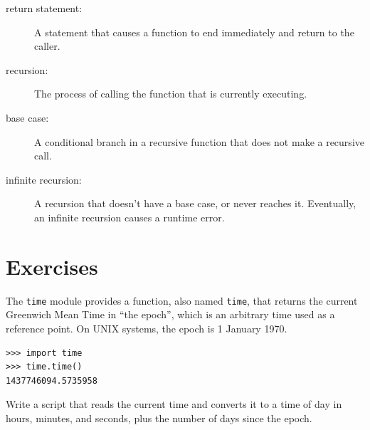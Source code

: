 \documentclass[10pt]{book}
\begin{document}
\begin{description}
\item[return statement:] A statement that causes a function to
end immediately and return to the caller.

\item[recursion:]  The process of calling the function that is
currently executing.

\item[base case:]  A conditional branch in a
recursive function that does not make a recursive call.

\item[infinite recursion:]  A recursion that doesn't have a
base case, or never reaches it.  Eventually, an infinite recursion
causes a runtime error.

\end{description}

\section{Exercises}

\begin{exercise}

The {\tt time} module provides a function, also named {\tt time}, that
returns the current Greenwich Mean Time in ``the epoch'', which is
an arbitrary time used as a reference point.  On UNIX systems, the
epoch is 1 January 1970.

\begin{verbatim}
>>> import time
>>> time.time()
1437746094.5735958
\end{verbatim}

Write a script that reads the current time and converts it to
a time of day in hours, minutes, and seconds, plus the number of
days since the epoch.

\end{exercise}
\end{document}
